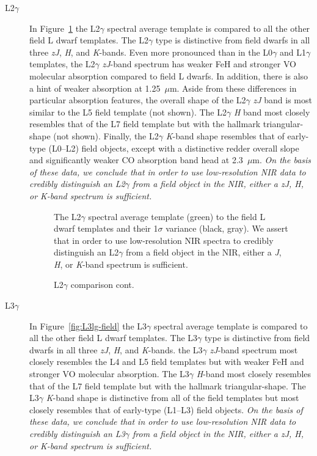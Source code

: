 \documentclass[modern,trackchanges]{aastex61}
\begin{document}
\begin{description}
\item[L2$\gamma$]{
In Figure~\ref{fig:L2lg-field} the L2$\gamma$ spectral average template is compared to all the other field L dwarf templates.
The L2$\gamma$ type is distinctive from field dwarfs in all three \emph{zJ}, \emph{H}, and \emph{K}-bands.
Even more pronounced than in the L0$\gamma$ and L1$\gamma$ templates, the L2$\gamma$ \emph{zJ}-band spectrum has weaker FeH and stronger VO molecular absorption compared to field L dwarfs.
In addition, there is also a hint of weaker  absorption at 1.25~$\mu$m. Aside from these differences in particular absorption features, the overall shape of the L2$\gamma$ \emph{zJ} band is most similar to the L5 field template (not shown).
The L2$\gamma$ \emph{H} band most closely resembles that of the L7 field template but with the hallmark  triangular-shape (not shown).
Finally, the L2$\gamma$ \emph{K}-band shape resembles that of early-type (L0--L2) field objects, except with a distinctive redder overall slope and significantly weaker CO absorption band head at 2.3~$\mu$m.
\emph{On the basis of these data, we conclude that in order to use low-resolution NIR data to credibly distinguish an L2$\gamma$ from a field object in the NIR, either a \emph{zJ}, \emph{H}, or \emph{K}-band spectrum is sufficient.}
}

\begin{figure}[b]
    \caption{The L2$\gamma$ spectral average template (green) to the field L dwarf templates and their 1$\sigma$ variance (black, gray).
    We assert that in order to use low-resolution NIR spectra to credibly distinguish an L2$\gamma$ from a field object in the NIR, either a \emph{J}, \emph{H}, or \emph{K}-band spectrum is sufficient.}
    \label{fig:L2lg-field}
\end{figure}

\begin{figure}
  \caption{L2$\gamma$ comparison cont.}
\end{figure}
\clearpage

\item[L3$\gamma$]{
In Figure~\ref{fig:L3lg-field} the L3$\gamma$ spectral average template is compared to all the other field L dwarf templates.
The L3$\gamma$ type is distinctive from field dwarfs in all three \emph{zJ}, \emph{H}, and \emph{K}-bands.
the L3$\gamma$ \emph{zJ}-band spectrum most closely resembles the L4 and L5 field templates but with weaker FeH and stronger VO molecular absorption.
The L3$\gamma$ \emph{H}-band most closely resembles that of the L7 field template but with the hallmark triangular-shape.
The L3$\gamma$ \emph{K}-band shape is distinctive from all of the field templates but most closely resembles that of early-type (L1--L3) field objects.
\emph{On the basis of these data, we conclude that in order to use low-resolution NIR data to credibly distinguish an L3$\gamma$ from a field object in the NIR, either a \emph{zJ}, \emph{H}, or \emph{K}-band spectrum is sufficient.}
}


\end{description}
\end{document}
